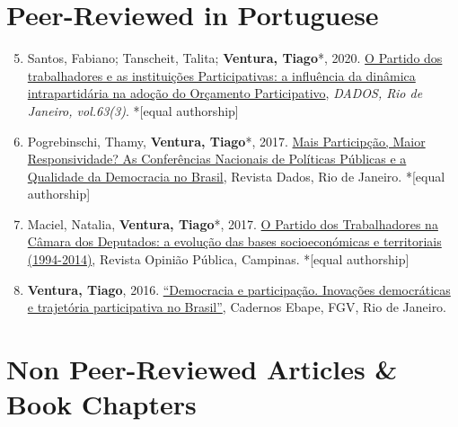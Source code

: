 \documentclass[letterpaper, 11pt]{article}
\newenvironment{benumerate}[1]{
    \let\oldItem\item
    \def\item{\addtocounter{enumi}{-2}\oldItem}
    \begin{enumerate}[leftmargin=2em]
    \setcounter{enumi}{#1}
    \addtocounter{enumi}{1}
}{
    \end{enumerate}
}
\begin{document}
    \section*{Peer-Reviewed in Portuguese}

    \begin{benumerate}{4}

    \item  Santos, Fabiano; Tanscheit, Talita; \textbf{Ventura, Tiago}*, 2020. \href{https://www.scielo.br/pdf/dados/v63n3/0011-5258-dados-63-3-e20180152.pdf}{ O Partido dos trabalhadores e as instituições Participativas: a influência da dinâmica intrapartidária na adoção do Orçamento Participativo}, \textit{DADOS, Rio de Janeiro, vol.63(3)}. *[equal authorship]


    \item  Pogrebinschi, Thamy,  \textbf{Ventura, Tiago}*, 2017. \href{http://www.scielo.br/scielo.php?pid=S0011-52582017000100007&script=sci_abstract}{ Mais Particip\c{c}\~ao, Maior Responsividade? As Confer\^encias Nacionais de Pol\'iticas P\'ublicas e a Qualidade da Democracia no Brasil}, Revista Dados, Rio de Janeiro. *[equal authorship]


        \item Maciel, Natalia,  \textbf{Ventura, Tiago}*, 2017. \href{http://www.scielo.br/pdf/op/v23n1/1807-0191-op-23-1-0096.pdf}{O Partido dos Trabalhadores na C\^amara dos Deputados: a evolu\c{c}\~{a}o das bases socioecon\'omicas e territoriais (1994-2014)}, Revista Opini\~ao P\'ublica, Campinas. *[equal authorship]


        \item \textbf{Ventura, Tiago}, 2016. \href{http://www.scielo.br/pdf/cebape/v14n3/1679-3951-cebape-14-03-00705.pdf}{``Democracia e participa\c{c}\~ao. Inova\c{c}\~oes democr\'aticas e trajet\'oria participativa no Brasil''},  Cadernos Ebape, FGV, Rio de Janeiro.

    \end{benumerate}



\section*{Non Peer-Reviewed Articles \& Book Chapters}
\end{document}
